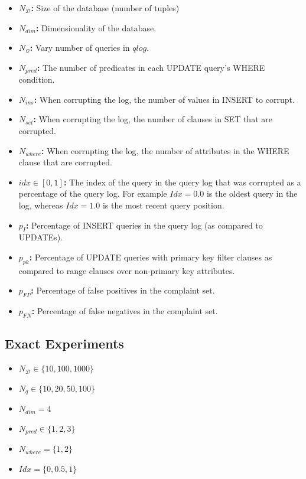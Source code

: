 \begin{itemize}
\item {\bf $N_\mathcal{D}$: } Size of the database (number of tuples)
\item {\bf $N_{dim}$:} Dimensionality of the database.
\item {\bf $N_\mathcal{Q}$:} Vary number of queries in $qlog$.
\item {\bf $N_{pred}$:} The number of predicates in each UPDATE query's WHERE condition.
\item {\bf $N_{ins}$: } When corrupting the log, the number of values in INSERT to corrupt.
\item {\bf $N_{set}$: } When corrupting the log, the number of clauses in SET that are corrupted.
\item {\bf $N_{where}$: } When corrupting the log, the number of attributes in the WHERE clause that are corrupted.
\item {\bf $idx \in [0, 1]$: } The index of the query in the query log that was corrupted as a percentage of the query log.  
      For example $Idx = 0.0$ is the oldest query in the log, whereas $Idx = 1.0$ is the most recent query position.
\item {\bf $p_{I}$: } Percentage of INSERT queries in the query log (as compared to UPDATEs).
\item {\bf $p_{pk}$: } Percentage of UPDATE queries with primary key filter clauses as compared to range clauses over non-primary key attributes.
\item {\bf $p_{FP}$: } Percentage of false positives in the complaint set.
\item {\bf $p_{FN}$: } Percentage of false negatives in the complaint set.
\end{itemize}



\subsection{Exact Experiments}

\begin{itemize}
\item $N_\mathcal{D} \in \{10, 100, 1000\}$
\item $N_q \in \{10, 20, 50, 100\}$
\item $N_{dim} = 4$
\item $N_{pred} \in \{1, 2, 3\}$
\item $N_{where} = \{1, 2\}$
\item $Idx = \{0, 0.5, 1\}$
\end{itemize}

